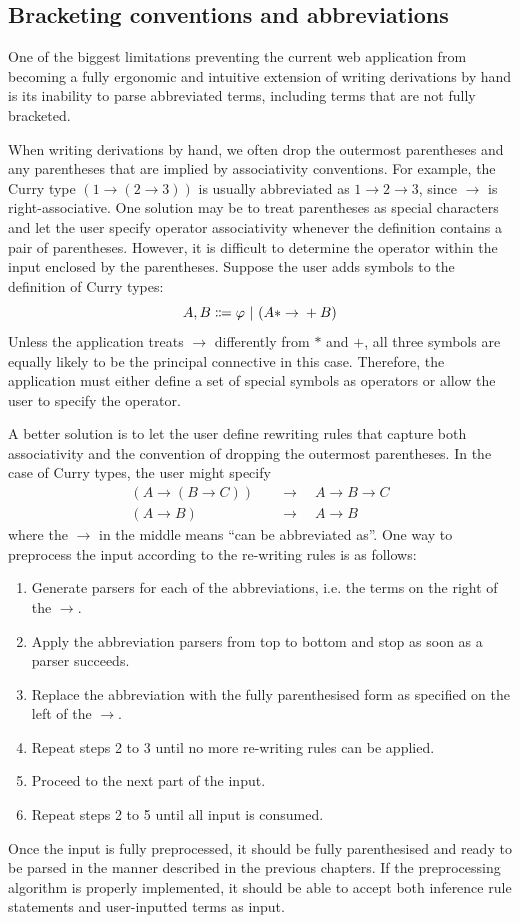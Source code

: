 \subsection{Bracketing conventions and abbreviations}
One of the biggest limitations preventing the current web application from becoming a fully ergonomic and intuitive extension of writing derivations by hand is its inability to parse abbreviated terms, including terms that are not fully bracketed.

When writing derivations by hand, we often drop the outermost parentheses and any parentheses that are implied by associativity conventions. For example, the Curry type $(1 \to (2 \to 3))$ is usually abbreviated as $1 \to 2 \to 3$, since $\to$ is right-associative. One solution may be to treat parentheses as special characters and let the user specify operator associativity whenever the definition contains a pair of parentheses. However, it is difficult to determine the operator within the input enclosed by the parentheses. Suppose the user adds symbols to the definition of Curry types:
\[
    A, B \Coloneqq \varphi \ |\  (A* \to{} +B)
\]
Unless the application treats $\to$ differently from $*$ and $+$, all three symbols are equally likely to be the principal connective in this case. Therefore, the application must either define a set of special symbols as operators or allow the user to specify the operator.

A better solution is to let the user define rewriting rules that capture both associativity and the convention of dropping the outermost parentheses. In the case of Curry types, the user might specify
\begin{align*}
    (A \to (B \to C)) \quad &\to \quad A \to B \to C \\
    (A \to B) \quad &\to \quad A \to B
\end{align*}
where the $\to$ in the middle means ``can be abbreviated as''. One way to preprocess the input according to the re-writing rules is as follows:
\begin{enumerate}
    \item Generate parsers for each of the abbreviations, i.e. the terms on the right of the $\to$.
    \item Apply the abbreviation parsers from top to bottom and stop as soon as a parser succeeds.
    \item Replace the abbreviation with the fully parenthesised form as specified on the left of the $\to$.
    \item Repeat steps 2 to 3 until no more re-writing rules can be applied.
    \item Proceed to the next part of the input.
    \item Repeat steps 2 to 5 until all input is consumed.
\end{enumerate}
Once the input is fully preprocessed, it should be fully parenthesised and ready to be parsed in the manner described in the previous chapters. If the preprocessing algorithm is properly implemented, it should be able to accept both inference rule statements and user-inputted terms as input.

